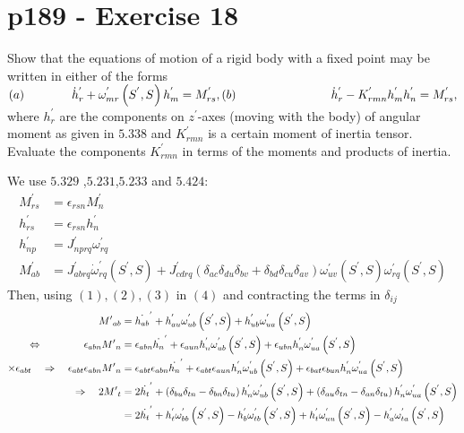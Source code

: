 \section{p189 - Exercise 18}
\begin{tcolorbox}
Show that the equations of motion of a rigid body with a fixed point may be written in either of the forms\\
$(a)\quad\quad\quad\quad \dot{h}^{'}_r+\omega^{'}_{mr}\left(S^{'},S^{}\right)h^{'}_m = M^{'}_{rs},\\
(b)\quad\quad\quad\quad  \quad\quad\quad\quad \dot{h}^{'}_r-K^{'}_{rmn}h^{'}_m h^{'}_n= M^{'}_{rs},$\\
where $h^{'}_r$ are the components on $z^{'}$-axes (moving with the body) of angular moment as given in $\mathbf{5.338}$ and $K^{'}_{rmn}$ is a certain moment of inertia tensor. Evaluate the components  $K^{'}_{rmn}$ in terms of the moments and products of inertia.
\end{tcolorbox} 
We use $\mathbf{5.329}$ ,$\mathbf{5.231}$,$\mathbf{5.233}$ and $\mathbf{5.424}$:
\begin{align}
M^{'}_{rs}&= \epsilon_{rsn}M^{'}_{n}\\
h^{'}_{rs}&= \epsilon_{rsn}h^{'}_{n}\\
h^{'}_{np}&= J^{'}_{nprq} \omega^{'}_{rq}\\
 M^{'}_{ab}&=J^{'}_{abrq} \dot{\omega}^{'}_{rq}\left(S^{'},S\right)+J^{'}_{cdrq}\left(\delta_{ac}\delta_{du}\delta_{bv}+\delta_{bd}\delta_{cu}\delta_{av}\right)\omega^{'}_{uv}\left(S^{'},S\right) \omega^{'}_{rq}\left(S^{'},S\right)
\end{align}
Then, using $(1),(2),(3)$ in $(4)$ and contracting the terms in $\delta_{ij}$
\begin{align}
M{'}_{ab}&= \dot{h_{ab}}^{'}+h^{'}_{au}\omega^{'}_{ub}\left(S^{'},S\right) +h^{'}_{ub}\omega^{'}_{ua}\left(S^{'},S\right)\\
\Leftrightarrow \quad\quad\quad\quad \epsilon_{abn}M{'}_{n}&= \epsilon_{abn}\dot{h_{n}}^{'}+\epsilon_{aun}h^{'}_{n}\omega^{'}_{ub}\left(S^{'},S\right) +\epsilon_{ubn}h^{'}_{n}\omega^{'}_{ua}\left(S^{'},S\right)\\
\times \epsilon_{abt}\quad \Rightarrow \quad \epsilon_{abt}\epsilon_{abn}M{'}_{n}&= \epsilon_{abt}\epsilon_{abn}\dot{h_{n}}^{'}+\epsilon_{abt}\epsilon_{aun}h^{'}_{n}\omega^{'}_{ub}\left(S^{'},S\right) +\epsilon_{bat}\epsilon_{bun}h^{'}_{n}\omega^{'}_{ua}\left(S^{'},S\right)\\
\Rightarrow \quad 2 M{'}_{t}&= 2\dot{h_{t}}^{'}+\left(\delta_{bu}\delta_{tn} -\delta_{bn}\delta_{tu}\right)h^{'}_{n}\omega^{'}_{ub}\left(S^{'},S\right) +\left(\delta_{au}\delta_{tn} -\delta_{an}\delta_{tu}\right)h^{'}_{n}\omega^{'}_{ua}\left(S^{'},S\right)\\
&= 2\dot{h_{t}}^{'}+h^{'}_{t}\omega^{'}_{bb}\left(S^{'},S\right) -h^{'}_{b}\omega^{'}_{tb}\left(S^{'},S\right) +h^{'}_{t}\omega^{'}_{uu}\left(S^{'},S\right) -h^{'}_{a}\omega^{'}_{ta}\left(S^{'},S\right)\end{align}
